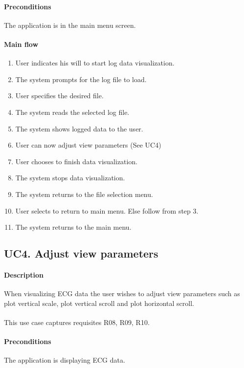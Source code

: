 			\paragraph{Preconditions} The application is in the main menu screen.
			\paragraph{Main flow}
				\begin{enumerate}
				\item User indicates his will to start log data visualization.
				\item The system prompts for the log file to load.
				\item User specifies the desired file.
				\item The system reads the selected log file.
				\item The system shows logged data to the user.
				\item User can now adjust view parameters (See UC4)
				\item User chooses to finish data visualization.
				\item The system stops data visualization.
				\item The system returns to the file selection menu.
				\item User selects to return to main menu. Else follow from step 3.
				\item The system returns to the main menu.
				\end{enumerate}

		\subsection{UC4. Adjust view parameters}

			\paragraph{Description} When visualizing ECG data the user wishes to adjust view parameters such as plot vertical scale, plot vertical scroll and plot horizontal scroll.\\
			\\This use case captures requisites R08, R09, R10.

			\paragraph{Preconditions} The application is displaying ECG data.
